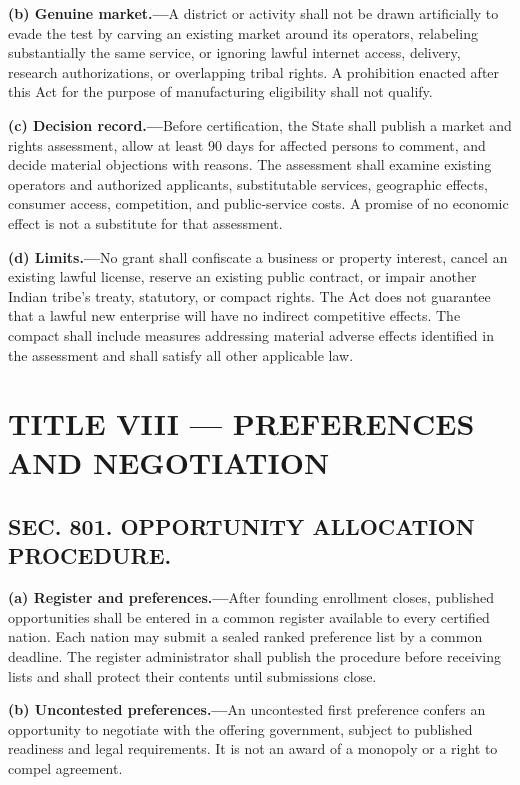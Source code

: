 \documentclass[12pt,letterpaper]{article}
\begin{document}
\textbf{(b) Genuine market.---}A district or activity shall not be drawn artificially to evade the test by carving an existing market around its operators, relabeling substantially the same service, or ignoring lawful internet access, delivery, research authorizations, or overlapping tribal rights. A prohibition enacted after this Act for the purpose of manufacturing eligibility shall not qualify.

\textbf{(c) Decision record.---}Before certification, the State shall publish a market and rights assessment, allow at least 90 days for affected persons to comment, and decide material objections with reasons. The assessment shall examine existing operators and authorized applicants, substitutable services, geographic effects, consumer access, competition, and public-service costs. A promise of no economic effect is not a substitute for that assessment.

\textbf{(d) Limits.---}No grant shall confiscate a business or property interest, cancel an existing lawful license, reserve an existing public contract, or impair another Indian tribe's treaty, statutory, or compact rights. The Act does not guarantee that a lawful new enterprise will have no indirect competitive effects. The compact shall include measures addressing material adverse effects identified in the assessment and shall satisfy all other applicable law.

\section*{TITLE VIII --- PREFERENCES AND NEGOTIATION}

\subsection*{SEC. 801. OPPORTUNITY ALLOCATION PROCEDURE.}

\textbf{(a) Register and preferences.---}After founding enrollment closes, published opportunities shall be entered in a common register available to every certified nation. Each nation may submit a sealed ranked preference list by a common deadline. The register administrator shall publish the procedure before receiving lists and shall protect their contents until submissions close.

\textbf{(b) Uncontested preferences.---}An uncontested first preference confers an opportunity to negotiate with the offering government, subject to published readiness and legal requirements. It is not an award of a monopoly or a right to compel agreement.
\end{document}
